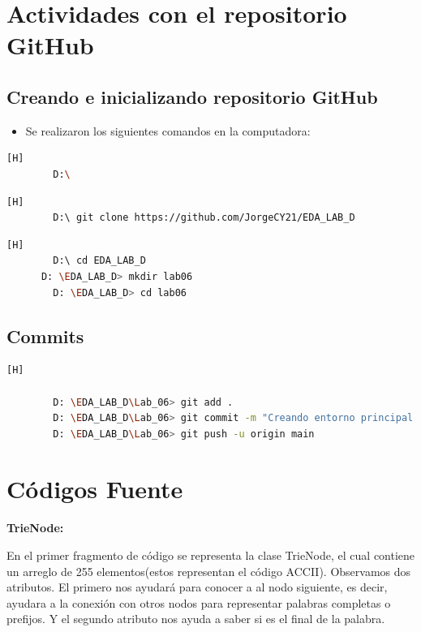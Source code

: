 \documentclass{article}
\begin{document}
	\section{Actividades con el repositorio GitHub}
	
	\subsection{Creando e inicializando repositorio GitHub}
	\begin{itemize}
		\item Se realizaron los siguientes comandos en la computadora:
	\end{itemize}	
		
	\begin{lstlisting}[language=bash,caption={Dirijíéndonos al directorio de trabajo}][H]
		D:\
	\end{lstlisting}	
	\begin{lstlisting}[language=bash,caption={Clonando repositorio GitHub}][H]
		D:\ git clone https://github.com/JorgeCY21/EDA_LAB_D
	\end{lstlisting}
	\begin{lstlisting}[language=bash,caption={Inicializando directorio para laboratorio 06}][H]
		D:\ cd EDA_LAB_D
      D: \EDA_LAB_D> mkdir lab06
		D: \EDA_LAB_D> cd lab06
	\end{lstlisting}
	
	\subsection{Commits}
	\begin{lstlisting}[language=bash,caption={Commit: Creamos el trie principal}][H]
		
		D: \EDA_LAB_D\Lab_06> git add .
		D: \EDA_LAB_D\Lab_06> git commit -m "Creando entorno principal de trie"	
		D: \EDA_LAB_D\Lab_06> git push -u origin main
	\end{lstlisting}
 
	
	\section{Códigos Fuente}	
	\begin{minipage}{\textwidth}	

		\textbf{TrieNode: }
		
		En el primer fragmento de código se representa la clase TrieNode, el cual contiene un arreglo
		de 255 elementos(estos representan el código ACCII). Observamos dos atributos. El primero
		nos ayudará para conocer a al nodo siguiente, es decir, ayudara a la conexión con otros nodos para
		representar palabras completas o prefijos. Y el segundo atributo nos ayuda a saber si es el final de la palabra.

	\end{minipage}
\end{document}
